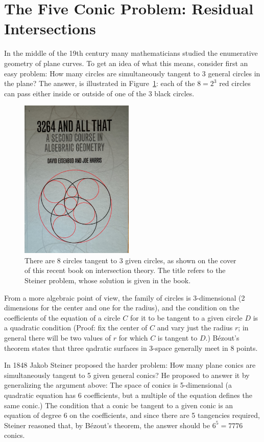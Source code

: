 \documentclass[11pt, oneside]{article}   	%
\begin{document}
\section{The Five Conic Problem: Residual Intersections}

In the middle of the 19th century many mathematicians studied the enumerative geometry of plane curves. To get an idea of what this means, consider first an easy problem: How many circles are simultaneously tangent to 3 general circles in the plane? The answer, is illustrated in Figure~\ref{3264Book}: each of the $8 = 2^{3}$ red circles can pass either inside or outside 
of one of the 3 black circles. \begin{figure}\label{3264Book}
\centerline {\includegraphics[height=3in]{3264Book.jpg}}
 \caption{There are 8 circles tangent to 3 given circles, as shown on the cover of this recent book
 on intersection theory. The title refers to the Steiner problem, whose solution is given in the book.}
\end{figure}
From a more algebraic point of view, the family of circles is 3-dimensional
(2 dimensions for the center and one for the radius), and the condition on the coefficients of the
equation of a circle $C$ for it to be tangent to a given circle $D$ is a quadratic condition (Proof: fix the center of $C$ and vary just the radius $r$; in general there will be two values of $r$ for which
$C$ is tangent to $D$.) B\'ezout's theorem states that three qadratic surfaces in 3-space generally
meet in 8 points.

In 1848 Jakob Steiner proposed the harder problem: How many plane conics are simultaneously tangent to 5 given general conics? He proposed to answer it by generalizing the argument above: The space of
conics is 5-dimensional (a quadratic equation has 6 coefficients, but a multiple of the equation defines the same conic.) The condition that a conic be tangent to a given conic is an equation of degree 6 on the coefficients, and since there are 5 tangencies required, Steiner reasoned that, by B\'ezout's theorem, the answer should be $6^{5} = 7776$ conics.
\end{document}
